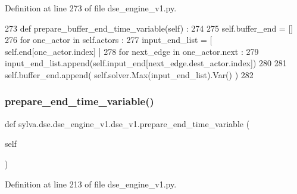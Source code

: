 Definition at line 273 of file dse\+\_\+engine\+\_\+v1.\+py.


\begin{DoxyCode}
273   \textcolor{keyword}{def }prepare\_buffer\_end\_time\_variable(self) :
274 
275     self.buffer\_end = []
276     \textcolor{keywordflow}{for} one\_actor \textcolor{keywordflow}{in} self.actors :
277       input\_end\_list = [ self.end[one\_actor.index] ]
278       \textcolor{keywordflow}{for} next\_edge \textcolor{keywordflow}{in} one\_actor.next :
279         input\_end\_list.append(self.input\_end[next\_edge.dest\_actor.index])
280 
281       self.buffer\_end.append( self.solver.Max(input\_end\_list).Var() )
282 
\end{DoxyCode}
\mbox{\label{classsylva_1_1dse_1_1dse__engine__v1_1_1dse__v1_ad0a1caaafb4b13a64807f4e621a1649d}} 
\subsubsection{\texorpdfstring{prepare\+\_\+end\+\_\+time\+\_\+variable()}{prepare\_end\_time\_variable()}}
{\footnotesize\ttfamily def sylva.\+dse.\+dse\+\_\+engine\+\_\+v1.\+dse\+\_\+v1.\+prepare\+\_\+end\+\_\+time\+\_\+variable (\begin{DoxyParamCaption}\item[{}]{self }\end{DoxyParamCaption})}



Definition at line 213 of file dse\+\_\+engine\+\_\+v1.\+py.


